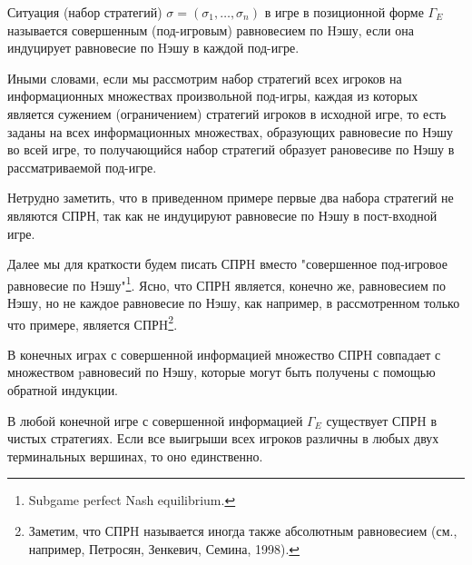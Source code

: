 \documentclass[12pt]{book}
\begin{document}
\begin{definition}
Ситуация (набор стратегий) $\sigma=(\sigma_1,\ldots,\sigma_n)$ в
игре в позиционной форме $\Gamma_E$ называется совершенным
(под-игровым) равновесием по Hэшу, если она индуцирует равновесие по
Hэшу в каждой под-игре.
\end{definition}

Иными словами, если мы рассмотрим набор стратегий всех игроков на
информационных множествах произвольной под-игры, каждая из которых
является сужением (ограничением) стратегий игроков в исходной игре,
то есть заданы на всех информационных множествах, образующих
равновесие по Нэшу во всей игре, то получающийся набор стратегий
образует рановесиве по Нэшу в рассматриваемой под-игре.

Нетрудно заметить, что в приведенном примере первые два набора
стратегий не являются СПРН, так как не индуцируют равновесие по Нэшу в
пост-входной игре.

Далее мы для краткости будем писать СПРH вместо "совершенное
под-игровое равновесие по Hэшу"\footnote{ Subgame perfect Nash
equilibrium.}. Ясно, что СПРH является, конечно же, равновесием по Нэшу, но не
каждое равновесие по Нэшу, как например, в рассмотренном только что примере,
является СПРH\footnote{ Заметим, что СПРH называется иногда также
абсолютным равновесием (см., например, Петросян, Зенкевич, Семина,
1998).}.

В конечных играх с совершенной информацией  множество СПРH совпадает
с множеством pавновесий по Нэшу, которые могут быть получены с помощью обратной
индукции.

\begin{proposition}
В любой  конечной игре с совершенной информацией $\Gamma_E$
существует СПРH в чистых стратегиях. Если все выигрыши всех игроков
различны в любых двух терминальных вершинах, то оно единственно.
\end{proposition}
\end{document}
